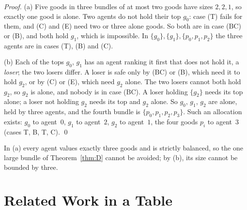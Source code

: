 \documentclass[runningheads,11pt]{llncs}
\begin{document}
\begin{proof}
(a) Five goods in three bundles of at most two goods have sizes $2,2,1$, so exactly one good is alone. Two agents do not hold their top $g_0$: case (T) fails for them, and (C) and (E) need two or three alone goods. So both are in case (BC) or (B), and both hold $g_1$, which is impossible. In $\{g_0\},\{g_1\},\{p_0,p_1,p_2\}$ the three agents are in cases (T), (B) and (C).

(b) Each of the tops $g_0$, $g_1$ has an agent ranking it first that does not hold it, a \emph{loser}; the two losers differ. A loser is safe only by (BC) or (B), which need it to hold $g_2$, or by (C) or (E), which need $g_2$ alone. The two losers cannot both hold $g_2$, so $g_2$ is alone, and nobody is in case (BC). A loser holding $\{g_2\}$ needs its top alone; a loser not holding $g_2$ needs its top and $g_2$ alone. So $g_0$, $g_1$, $g_2$ are alone, held by three agents, and the fourth bundle is $\{p_0,p_1,p_2,p_3\}$. Such an allocation exists: $g_0$ to agent~$0$, $g_1$ to agent~$2$, $g_2$ to agent~$1$, the four goods $p_i$ to agent~$3$ (cases T, B, T, C). \qed
\end{proof}

\noindent In (a) every agent values exactly three goods and is strictly balanced, so the one large bundle of Theorem~\ref{thm:D} cannot be avoided; by (b), its size cannot be bounded by three.

\section{Related Work in a Table}\label{app:rw}
\end{document}
